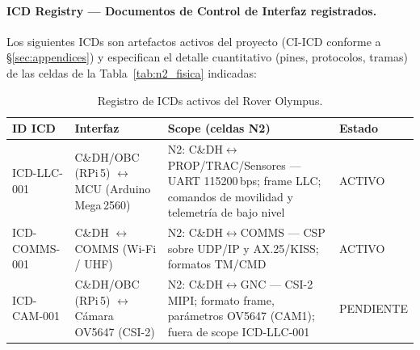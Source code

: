 \paragraph{ICD Registry — Documentos de Control de Interfaz registrados.}
Los siguientes ICDs son artefactos activos del proyecto (CI-ICD conforme a \S\ref{sec:appendices}) y especifican el detalle cuantitativo (pines, protocolos, tramas) de las celdas de la Tabla~\ref{tab:n2_fisica} indicadas:

\begin{table}[H]
\centering
\small
\begin{tabularx}{\textwidth}{| l | l | X | l |}
\hline
\textbf{ID ICD} & \textbf{Interfaz} & \textbf{Scope (celdas N2)} & \textbf{Estado} \\ \hline
ICD-LLC-001 & C\&DH/OBC (RPi\,5) $\leftrightarrow$ MCU (Arduino Mega\,2560) & N2: C\&DH$\leftrightarrow$PROP/\allowbreak TRAC/\allowbreak Sensores — UART 115200\,bps; frame LLC; comandos de movilidad y telemetría de bajo nivel & ACTIVO \\ \hline
ICD-COMMS-001 & C\&DH $\leftrightarrow$ COMMS (Wi-Fi / UHF) & N2: C\&DH$\leftrightarrow$COMMS — CSP sobre UDP/IP y AX.25/KISS; formatos TM/CMD & ACTIVO \\ \hline
ICD-CAM-001 & C\&DH/OBC (RPi\,5) $\leftrightarrow$ Cámara OV5647 (CSI-2) & N2: C\&DH$\leftrightarrow$GNC — CSI-2 MIPI; formato frame, parámetros OV5647 (CAM1); fuera de scope ICD-LLC-001 & PENDIENTE \\ \hline
\end{tabularx}
\caption{Registro de ICDs activos del Rover Olympus.}
\label{tab:icd_registry}
\end{table}





